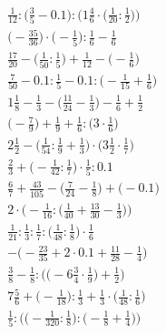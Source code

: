 \documentclass[8pt]{article}
\begin{document}
\begin{align}
\frac{1}{12} : \Big(\frac{3}{5} - 0.1\Big) : \Big(1\frac{4}{6} \cdot \big(\frac{1}{20} : \frac{1}{2}\big)\Big) \\
\big(-\frac{35}{36}\big) \cdot \big(-\frac{1}{5}\big) : \frac{1}{6} - \frac{1}{6} \\
\frac{17}{20} - \big(\frac{1}{50} : \frac{1}{5}\big) + \frac{1}{12} - \big(-\frac{1}{6}\big) \\
\frac{7}{50} - 0.1 : \frac{1}{5} - 0.1 : \big(-\frac{1}{15} + \frac{1}{6}\big) \\
1\frac{1}{8} - \frac{1}{3} - \big(\frac{11}{24} - \frac{1}{3}\big) - \frac{1}{6} + \frac{1}{2} \\
\big(-\frac{7}{9}\big) + \frac{1}{9} + \frac{1}{6} : \big(3 \cdot \frac{1}{6}\big) \\
2\frac{1}{2} - \big(\frac{1}{54} : \frac{1}{9} + \frac{1}{3}\big) \cdot \big(3\frac{1}{2} \cdot \frac{1}{7}\big) \\
\frac{2}{3} + \big(-\frac{1}{42} : \frac{1}{7}\big) \cdot \frac{1}{5} : 0.1 \\
\frac{6}{7} + \frac{43}{105} - \big(\frac{7}{24} - \frac{1}{8}\big) + \big(-0.1\big) \\
2 \cdot \Big(-\frac{1}{16} : \big(\frac{1}{40} + \frac{13}{30} - \frac{1}{3}\big)\Big) \\
\frac{1}{21} : \frac{1}{3} : \frac{1}{7} : \big(\frac{1}{48} : \frac{1}{8}\big) \cdot \frac{1}{6} \\
-\big(-\frac{23}{35} + 2 \cdot 0.1 + \frac{11}{28} - \frac{1}{4}\big) \\
\frac{3}{8} - \frac{1}{8} : \Big(\big(-6\frac{3}{4} \cdot \frac{1}{9}\big) + \frac{1}{2}\Big) \\
7\frac{5}{6} + \big(-\frac{1}{18}\big) : \frac{1}{3} + \frac{1}{3} \cdot \big(\frac{1}{48} : \frac{1}{6}\big) \\
\frac{1}{5} : \Big(\big(-\frac{1}{320} : \frac{1}{8}\big) : \big(-\frac{1}{8} + \frac{1}{4}\big)\Big)
\end{align}
\end{document}
